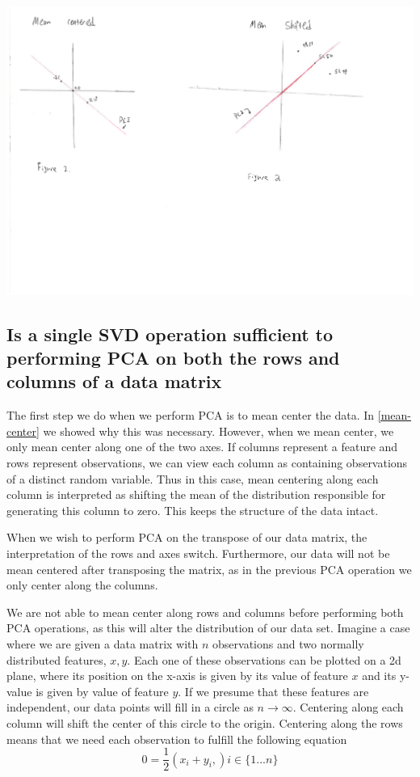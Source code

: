 \documentclass[11pt,a4paper,landscape]{article}
\begin{document}
\includegraphics[width=\textwidth]{figure1_2.pdf}

\subsection{Is a single SVD operation sufficient to performing PCA on both the rows and columns of a data matrix}
\label{svd}

The first step we do when we perform PCA is to mean center the data. In \ref{mean-center} we showed why this was necessary. However, when we mean center, we only mean center along one of the two axes. If columns represent a feature and rows represent observations, we can view each column as containing observations of a distinct random variable. Thus in this case, mean centering along each column is interpreted as shifting the mean of the distribution responsible for generating this column to zero. This keeps the structure of the data intact.\newline

When we wish to perform PCA on the transpose of our data matrix, the interpretation of the rows and axes switch. Furthermore, our data will not be mean centered after transposing the matrix, as in the previous PCA operation we only center along the columns.\newline

We are not able to mean center along rows and columns before performing both PCA operations, as this will alter the distribution of our data set. Imagine a case where we are given a data matrix with $ n $ observations and two normally distributed features, $x, y$. Each one of these observations can be plotted on a 2d plane, where its position on the x-axis is given by its value of feature $ x $ and its y-value is given by value of feature $ y $. If we presume that these features are independent, our data points will fill in a circle as $ n \rightarrow  \infty $. Centering along each column will shift the center of this circle to the origin. Centering along the rows means that we need each observation to fulfill the following equation
$$ 0 = \frac{1}{2} (x_{i} + y_{i},) i \in \lbrace 1 ...  n\rbrace $$
\end{document}
